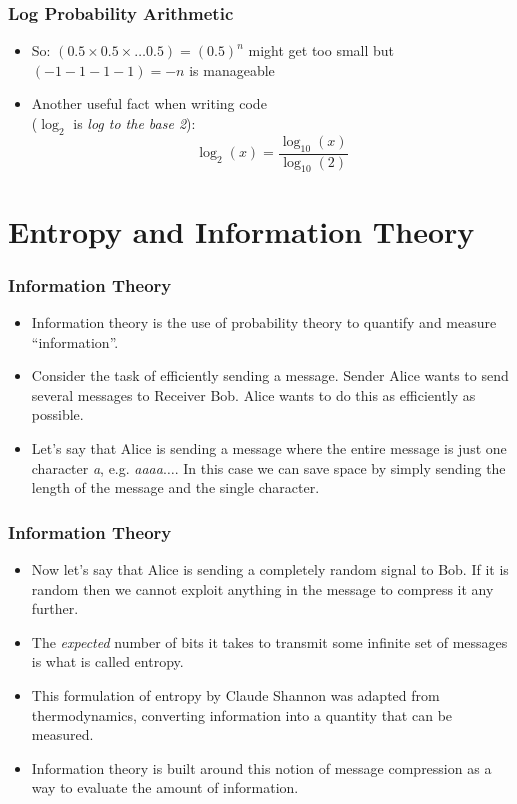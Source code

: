 \begin{frame}
\frametitle{Log Probability Arithmetic}
\begin{itemize}[<+->]
\item So: $(0.5 \times 0.5 \times \ldots 0.5) = (0.5)^n$ might get too
  small but $(- 1 - 1 - 1 - 1) = - n$ is manageable
\item Another useful fact when writing code \\
($\log_2$ is {\em log to the base 2}):
\[ \log_2(x) = \frac{\log_{10}(x)}{\log_{10}(2)} \]
\end{itemize}

\end{frame}


\section{Entropy and Information Theory}
\frame{\tableofcontents[currentsection]}

\begin{frame}
\frametitle{Information Theory}
\begin{itemize}[<+->]
\item Information theory is the use of probability theory to quantify
  and measure ``information''.
\item Consider the task of efficiently sending a message. Sender Alice
  wants to send several messages to Receiver Bob. Alice wants to do
  this as efficiently as possible.
\item Let's say that Alice is sending a message where the entire
  message is just one character {\em a}, e.g. {\em aaaa$\ldots$}. In
  this case we can save space by simply sending the length of the
  message and the single character.
\end{itemize}

\end{frame}

\begin{frame}
\frametitle{Information Theory}
\begin{itemize}[<+->]
\item Now let's say that Alice is sending a completely random signal to
  Bob. If it is random then we cannot exploit anything in the message
  to compress it any further.
\item The {\em expected} number of bits it takes to transmit
  some infinite set of messages is what is called entropy. 
\item This formulation of entropy by Claude Shannon was adapted from
  thermodynamics, converting information into a quantity that can be measured.
\item Information theory is built around this notion of message
  compression as a way to evaluate the amount of information. 
\end{itemize}

\end{frame}

